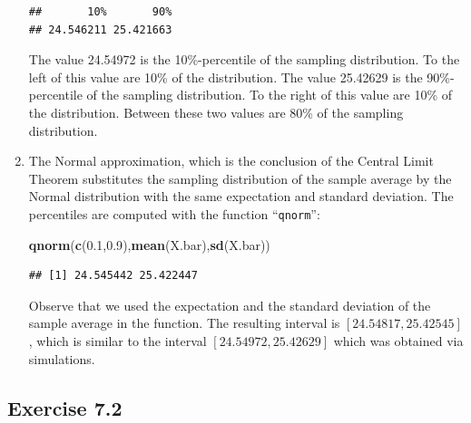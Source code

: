 \documentclass[]{krantz}
\makeatletter
\newenvironment{Shaded}{\begin{snugshade}}{\end{snugshade}}
\newcommand{\KeywordTok}[1]{\textcolor[rgb]{0.13,0.29,0.53}{\textbf{#1}}}
\newcommand{\FloatTok}[1]{\textcolor[rgb]{0.00,0.00,0.81}{#1}}
\newcommand{\NormalTok}[1]{#1}
\newenvironment{kframe}{%
\medskip{}
\setlength{\fboxsep}{.8em}
 \def\at@end@of@kframe{}%
 \ifinner\ifhmode%
  \def\at@end@of@kframe{\end{minipage}}%
  \begin{minipage}{\columnwidth}%
 \fi\fi%
 \def\FrameCommand##1{\hskip\@totalleftmargin \hskip-\fboxsep
 \colorbox{shadecolor}{##1}\hskip-\fboxsep
     \hskip-\linewidth \hskip-\@totalleftmargin \hskip\columnwidth}%
 \MakeFramed {\advance\hsize-\width
   \@totalleftmargin\z@ \linewidth\hsize
   \@setminipage}}%
 {\par\unskip\endMakeFramed%
 \at@end@of@kframe}
\renewenvironment{Shaded}{\begin{kframe}}{\end{kframe}}
\theoremstyle{definition}
\theoremstyle{definition}
\theoremstyle{definition}
\theoremstyle{remark}
\makeatother
\begin{document}
\begin{enumerate}
\begin{verbatim}
##       10%       90% 
## 24.546211 25.421663
\end{verbatim}

  The value 24.54972 is the 10\%-percentile of the sampling
  distribution. To the left of this value are 10\% of the distribution.
  The value 25.42629 is the 90\%-percentile of the sampling
  distribution. To the right of this value are 10\% of the distribution.
  Between these two values are 80\% of the sampling distribution.
\item
  The Normal approximation, which is the conclusion of the Central Limit
  Theorem substitutes the sampling distribution of the sample average by
  the Normal distribution with the same expectation and standard
  deviation. The percentiles are computed with the function
  ``\texttt{qnorm}'':

\begin{Shaded}
\begin{Highlighting}[]
\KeywordTok{qnorm}\NormalTok{(}\KeywordTok{c}\NormalTok{(}\FloatTok{0.1}\NormalTok{,}\FloatTok{0.9}\NormalTok{),}\KeywordTok{mean}\NormalTok{(X.bar),}\KeywordTok{sd}\NormalTok{(X.bar))}
\end{Highlighting}
\end{Shaded}

\begin{verbatim}
## [1] 24.545442 25.422447
\end{verbatim}

  Observe that we used the expectation and the standard deviation of the
  sample average in the function. The resulting interval is
  \([24.54817, 25.42545]\), which is similar to the interval
  \([24.54972, 25.42629]\) which was obtained via simulations.
\end{enumerate}

\subsection*{Exercise 7.2}\label{exercise-7.2}
\end{document}
